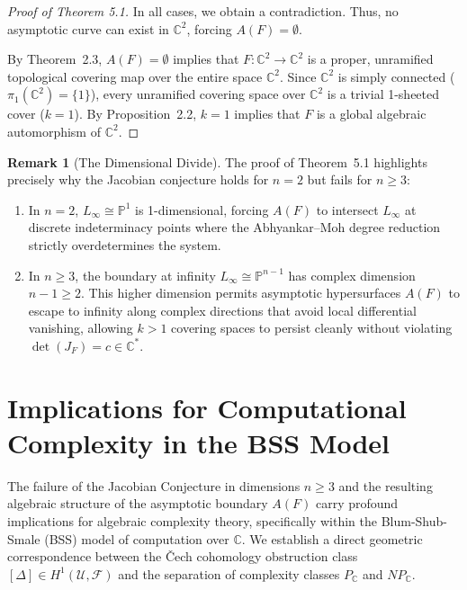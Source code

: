 \documentclass[11pt,reqno]{amsart}
\theoremstyle{definition}
\newtheorem{remark}[theorem]{Remark}
\begin{document}
\begin{proof}[Proof of Theorem 5.1]
In all cases, we obtain a contradiction. Thus, no asymptotic curve can exist in $\mathbb{C}^2$, forcing $A(F) = \emptyset$.

By Theorem~2.3, $A(F) = \emptyset$ implies that $F: \mathbb{C}^2 \to \mathbb{C}^2$ is a proper, unramified topological covering map over the entire space $\mathbb{C}^2$. Since $\mathbb{C}^2$ is simply connected ($\pi_1(\mathbb{C}^2) = \{1\}$), every unramified covering space over $\mathbb{C}^2$ is a trivial 1-sheeted cover ($k = 1$). By Proposition~2.2, $k = 1$ implies that $F$ is a global algebraic automorphism of $\mathbb{C}^2$.
\end{proof}

\begin{remark}[The Dimensional Divide]
The proof of Theorem~5.1 highlights precisely why the Jacobian conjecture holds for $n = 2$ but fails for $n \ge 3$:
\begin{enumerate}
    \item In $n = 2$, $L_\infty \cong \mathbb{P}^1$ is 1-dimensional, forcing $A(F)$ to intersect $L_\infty$ at discrete indeterminacy points where the Abhyankar--Moh degree reduction strictly overdetermines the system.
    \item In $n \ge 3$, the boundary at infinity $L_\infty \cong \mathbb{P}^{n-1}$ has complex dimension $n-1 \ge 2$. This higher dimension permits asymptotic hypersurfaces $A(F)$ to escape to infinity along complex directions that avoid local differential vanishing, allowing $k > 1$ covering spaces to persist cleanly without violating $\det(J_F) = c \in \mathbb{C}^*$.
\end{enumerate}
\end{remark}



\section{Implications for Computational Complexity in the BSS Model}

The failure of the Jacobian Conjecture in dimensions $n \ge 3$ and the resulting algebraic structure of the asymptotic boundary $A(F)$ carry profound implications for algebraic complexity theory, specifically within the Blum-Shub-Smale (BSS) model of computation over $\mathbb{C}$. We establish a direct geometric correspondence between the \v{C}ech cohomology obstruction class $[\Delta] \in H^1(\mathcal{U}, \mathcal{F})$ and the separation of complexity classes $P_{\mathbb{C}}$ and $NP_{\mathbb{C}}$.
\end{document}
